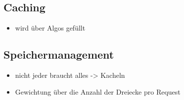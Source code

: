 \subsection{Caching}
\label{sec:basics:caching}
\begin{itemize}
 \item wird über Algos gefüllt
\end{itemize}

\subsection{Speichermanagement}
\label{sec:basics:speichermanagement}
\begin{itemize}
 \item nicht jeder braucht alles -> Kacheln
 \item Gewichtung über die Anzahl der Dreiecke pro Request
\end{itemize}
